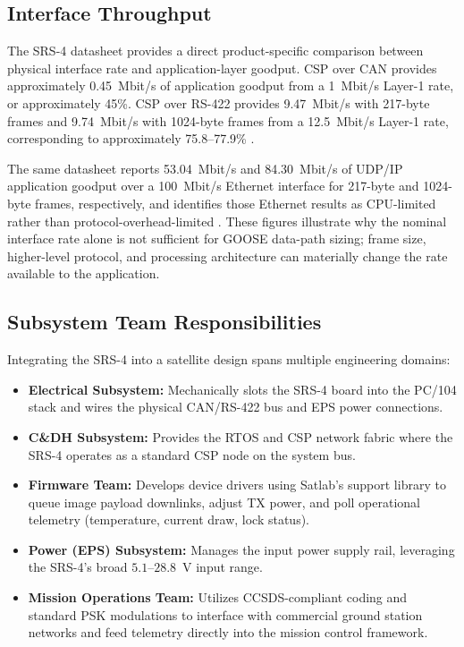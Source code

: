 \documentclass[10pt]{../datasheet}
\let\cite\citep
\begin{document}
\subsection{Interface Throughput}

The SRS-4 datasheet provides a direct product-specific comparison between
physical interface rate and application-layer goodput. CSP over CAN provides
approximately 0.45~Mbit/s of application goodput from a 1~Mbit/s Layer-1 rate,
or approximately 45\%. CSP over RS-422 provides 9.47~Mbit/s with 217-byte
frames and 9.74~Mbit/s with 1024-byte frames from a 12.5~Mbit/s Layer-1 rate,
corresponding to approximately 75.8--77.9\% \cite{satlab_srs4}.

The same datasheet reports 53.04~Mbit/s and 84.30~Mbit/s of UDP/IP
application goodput over a 100~Mbit/s Ethernet interface for 217-byte and
1024-byte frames, respectively, and identifies those Ethernet results as
CPU-limited rather than protocol-overhead-limited \cite{satlab_srs4}. These
figures illustrate why the nominal interface rate alone is not sufficient for
GOOSE data-path sizing; frame size, higher-level protocol, and processing
architecture can materially change the rate available to the application.

\subsection{Subsystem Team Responsibilities}
Integrating the SRS-4 into a satellite design spans multiple engineering
domains:
\begin{itemize}
  \item \textbf{Electrical Subsystem:} Mechanically slots the SRS-4 board into
        the PC/104 stack and wires the physical CAN/RS-422 bus and EPS power
        connections.
  \item \textbf{C\&DH Subsystem:} Provides the RTOS and CSP network fabric where
        the SRS-4 operates as a standard CSP node on the system bus.
  \item \textbf{Firmware Team:} Develops device drivers using Satlab's support
        library to queue image payload downlinks, adjust TX power, and poll
        operational telemetry (temperature, current draw, lock status).
  \item \textbf{Power (EPS) Subsystem:} Manages the input power supply rail,
        leveraging the SRS-4's broad $5.1$--$28.8$~V input range.
  \item \textbf{Mission Operations Team:} Utilizes CCSDS-compliant coding and
        standard PSK modulations to interface with commercial ground station networks
        and feed telemetry directly into the mission control framework.
\end{itemize}
\end{document}
